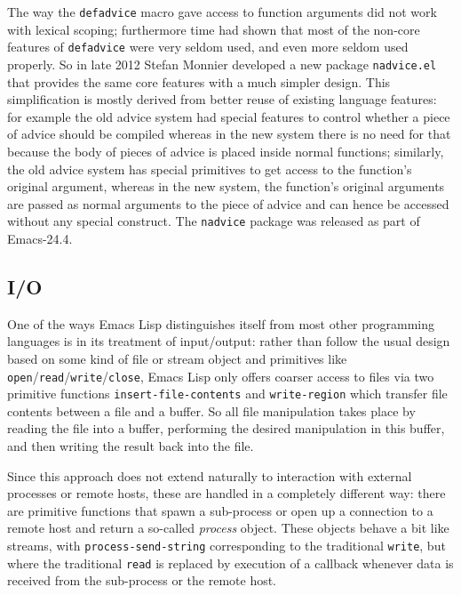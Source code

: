 \documentclass[format=acmsmall, review]{acmart}
\newcommand \Elisp {Emacs Lisp}
\begin{document}
The way the \texttt{defadvice} macro gave access to function arguments did
not work with lexical scoping; furthermore time had shown that most of the
non-core features of \texttt{defadvice} were very seldom used, and even more
seldom used properly.  So in late 2012 Stefan Monnier developed a new
package \texttt{nadvice.el} that provides the same core features with a much
simpler design.  This simplification is mostly derived from better reuse of
existing language features: for example the old advice system had special
features to control whether a piece of advice should be compiled whereas in
the new system there is no need for that because the body of pieces of
advice is placed inside normal functions; similarly, the old advice system
has special primitives to get access to the function's original argument,
whereas in the new system, the function's original arguments are passed as
normal arguments to the piece of advice and can hence be accessed without
any special construct.  The \texttt{nadvice} package was released as part of
Emacs-24.4.

\subsection{I/O}

One of the ways \Elisp{} distinguishes itself from most other programming
languages is in its treatment of input/output: rather than follow the usual
design based on some kind of file or stream object and primitives like
\texttt{open}/\texttt{read}/\texttt{write}/\texttt{close}, \Elisp{} only
offers coarser access to files via two primitive functions
\texttt{insert-file-contents} and \texttt{write-region} which transfer file
contents between a file and a buffer.  So all file manipulation takes place
by reading the file into a buffer, performing the desired manipulation in
this buffer, and then writing the result back into the file.

Since this approach does not extend naturally to interaction with external
processes or remote hosts, these are handled in a completely different way:
there are primitive functions that spawn a sub-process or open up
a connection to a remote host and return a so-called \emph{process} object.
These objects behave a bit like streams, with \texttt{process-send-string}
corresponding to the traditional \texttt{write}, but where the traditional
\texttt{read} is replaced by execution of a callback whenever data is
received from the sub-process or the remote host.
\end{document}
